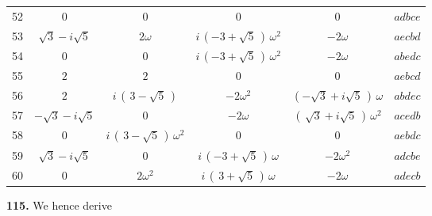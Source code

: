 \documentclass[11pt]{article}
\newcommand{\artno}[1]{\textbf{#1.}\quad}
\begin{document}
\begin{center}
\begin{longtable}{r|cccc|l}
52 & $0$ & $0$ & $0$ & $0$ & $adbce$\\
53 & $\sqrt{3} - i\sqrt{5}$ & $2\omega$ & $i\,(-3 + \sqrt{5}\,)\,\omega^{2}$ & $-2\omega$ & $aecbd$\\
54 & $0$ & $0$ & $i\,(-3 + \sqrt{5}\,)\,\omega^{2}$ & $-2\omega$ & $abedc$\\
55 & $2$ & $2$ & $0$ & $0$ & $aebcd$\\
56 & $2$ & $i\,(\,3 - \sqrt{5}\,)$ & $-2\omega^{2}$ & $(-\sqrt{3} + i\sqrt{5}\,)\,\omega$ & $abdec$\\
57 & $-\sqrt{3} - i\sqrt{5}$ & $0$ & $-2\omega$ & $(\,\sqrt{3} + i\sqrt{5}\,)\,\omega^{2}$ & $acedb$\\
58 & $0$ & $i\,(\,3 - \sqrt{5}\,)\,\omega^{2}$ & $0$ & $0$ & $aebdc$\\
59 & $\sqrt{3} - i\sqrt{5}$ & $0$ & $i\,(-3 + \sqrt{5}\,)\,\omega$ & $-2\omega^{2}$ & $adcbe$\\
60 & $0$ & $2\omega^{2}$ & $i\,(\,3 + \sqrt{5}\,)\,\omega$ & $-2\omega$ & $adecb$\\
\end{longtable}
\normalsize
\end{center}

\bigskip
\noindent
\artno{115} We hence derive
\end{document}
